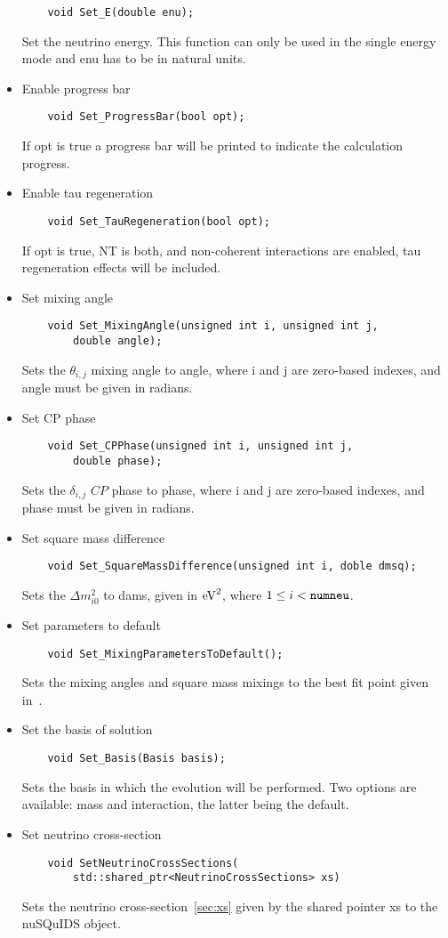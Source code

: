 \documentclass[3p,12pt]{elsarticle}
\newcommand{\ttf}{\ttfamily}
\begin{document}
\begin{itemize}
\begin{lstlisting}
    void Set_E(double enu);
  \end{lstlisting}
  Set the neutrino energy. This function can only be used in the
  single energy mode and {\ttf enu} has to be in natural units.
  \item Enable progress bar
  \begin{lstlisting}
    void Set_ProgressBar(bool opt);
  \end{lstlisting}
  If {\ttf opt} is {\ttf true} a progress bar will be printed to
  indicate the calculation progress. 
  \item Enable tau regeneration
  \begin{lstlisting}
    void Set_TauRegeneration(bool opt);
  \end{lstlisting}
  If {\ttf opt} is {\ttf true}, {\ttf NT} is {\ttf both}, and non-coherent 
    interactions are enabled, tau regeneration effects will be included.
  \item Set mixing angle
  \begin{lstlisting}
    void Set_MixingAngle(unsigned int i, unsigned int j,
        double angle);
  \end{lstlisting}
  Sets the $\theta_{i,j}$ mixing angle to {\ttf angle}, where {\ttf i}
  and {\ttf j} are zero-based indexes, and {\ttf angle} must be given in radians.
  \item Set CP phase
  \begin{lstlisting}
    void Set_CPPhase(unsigned int i, unsigned int j,
        double phase);
  \end{lstlisting}
  Sets the $\delta_{i,j}$ $CP$ phase to {\ttf phase}, where {\ttf i} and
  {\ttf j} are zero-based indexes, and {\ttf phase} must be given in radians.
  \item Set square mass difference
  \begin{lstlisting}
    void Set_SquareMassDifference(unsigned int i, doble dmsq);
  \end{lstlisting}
  Sets the $\Delta m^2_{i0}$ to {\ttf dams}, given in ${\rm eV}^2$,
  where $1\le i < {\rm \tt numneu}$. 
  \item Set parameters to default
  \begin{lstlisting}
    void Set_MixingParametersToDefault();
  \end{lstlisting}
  Sets the mixing angles and square mass mixings to the best fit point
  given in~\citep{Gonzalez-Garcia:2014bfa}. 
  \item Set the basis of solution
  \begin{lstlisting}
    void Set_Basis(Basis basis);
  \end{lstlisting}
  Sets the basis in which the evolution will be performed. Two options
  are available: {\ttf mass} and {\ttf interaction}, the latter being
  the default. 
\item Set neutrino cross-section
  \begin{lstlisting}
    void SetNeutrinoCrossSections(
        std::shared_ptr<NeutrinoCrossSections> xs)
  \end{lstlisting}
  Sets the neutrino cross-section~\ref{sec:xs} given by the shared
  pointer {\ttf xs} to the nuSQuIDS object.
\end{itemize}
  
\end{document}
